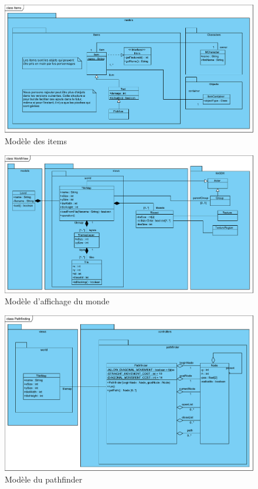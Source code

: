 \documentclass[a4paper]{report}
\begin{document}
\begin{figure}
    \center
    \includegraphics[scale=0.5]{img/class/Items}
    \caption{Modèle des items}
		\label{Items}
\end{figure}

\begin{figure}
    \center
    \includegraphics[scale=0.5]{img/class/WorldView}
    \caption{Modèle d'affichage du monde}
		\label{WorldView}
\end{figure}

\begin{figure}
    \center
    \includegraphics[scale=0.5]{img/class/Pathfinding}
    \caption{Modèle du pathfinder}
		\label{Pathfinding}
\end{figure}
\end{document}
